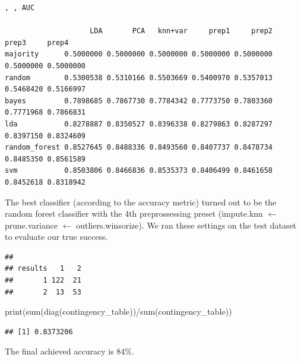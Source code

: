 \documentclass[
]{article}
\newenvironment{Shaded}{\begin{snugshade}}{\end{snugshade}}
\newcommand{\AttributeTok}[1]{\textcolor[rgb]{0.77,0.63,0.00}{#1}}
\newcommand{\ControlFlowTok}[1]{\textcolor[rgb]{0.13,0.29,0.53}{\textbf{#1}}}
\newcommand{\FunctionTok}[1]{\textcolor[rgb]{0.00,0.00,0.00}{#1}}
\newcommand{\NormalTok}[1]{#1}
\newcommand{\OtherTok}[1]{\textcolor[rgb]{0.56,0.35,0.01}{#1}}
\newcommand{\SpecialCharTok}[1]{\textcolor[rgb]{0.00,0.00,0.00}{#1}}
\newcommand{\StringTok}[1]{\textcolor[rgb]{0.31,0.60,0.02}{#1}}
\begin{document}
\begin{verbatim}
, , AUC

                    LDA       PCA   knn+var     prep1     prep2     prep3     prep4
majority      0.5000000 0.5000000 0.5000000 0.5000000 0.5000000 0.5000000 0.5000000
random        0.5300538 0.5310166 0.5503669 0.5400970 0.5357013 0.5468420 0.5166997
bayes         0.7898685 0.7867730 0.7784342 0.7773750 0.7803360 0.7771968 0.7866831
lda           0.8278887 0.8350527 0.8396338 0.8279863 0.8287297 0.8397150 0.8324609
random_forest 0.8527645 0.8488336 0.8493560 0.8407737 0.8478734 0.8485350 0.8561589
svm           0.8503806 0.8466836 0.8535373 0.8406499 0.8461658 0.8452618 0.8318942
\end{verbatim}

The best classifier (according to the accuracy metric) turned out to be
the random forest classifier with the 4th preprossessing preset
(impute.knn $\leftarrow$ prune.variance $\leftarrow$ outliers.winsorize). We
ran these settings on the test dataset to evaluate our true success.

\begin{Shaded}
\end{Shaded}

\begin{verbatim}
##        
## results   1   2
##       1 122  21
##       2  13  53
\end{verbatim}

\begin{Shaded}
\begin{Highlighting}[]
\FunctionTok{print}\NormalTok{(}\FunctionTok{sum}\NormalTok{(}\FunctionTok{diag}\NormalTok{(contingency\_table))}\SpecialCharTok{/}\FunctionTok{sum}\NormalTok{(contingency\_table))}
\end{Highlighting}
\end{Shaded}

\begin{verbatim}
## [1] 0.8373206
\end{verbatim}

The final achieved accuracy is 84\%.
\end{document}
